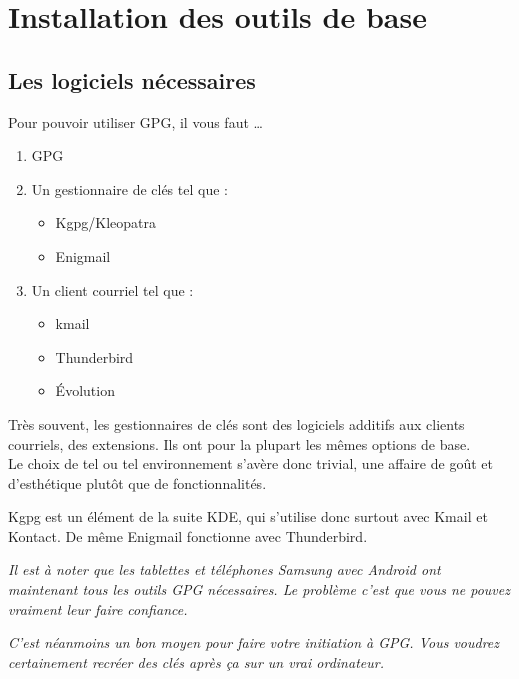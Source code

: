 \chapter{Installation des outils de base}

\section{Les logiciels nécessaires}\label{les-logiciels-nuxe9cessaires}

Pour pouvoir utiliser GPG, il vous faut \ldots{}

\begin{enumerate}
\def\labelenumi{\arabic{enumi}.}
\itemsep1pt\parskip0pt
\item
  GPG
\item
  Un gestionnaire de clés tel que :

  \begin{itemize}
  \itemsep1pt\parskip0pt
  \item
    Kgpg/Kleopatra
  \item
    Enigmail
  \end{itemize}
\item
  Un client courriel tel que :

  \begin{itemize}
  \itemsep1pt\parskip0pt
  \item
    kmail
  \item
    Thunderbird
  \item
    Évolution
  \end{itemize}
\end{enumerate}

Très souvent, les gestionnaires de clés sont des logiciels additifs aux
clients courriels, des extensions. Ils ont pour la plupart les mêmes
options de base.\\Le choix de tel ou tel environnement s'avère donc
trivial, une affaire de goût et d'esthétique plutôt que de
fonctionnalités.

Kgpg est un élément de la suite KDE, qui s'utilise donc surtout avec
Kmail et Kontact. De même Enigmail fonctionne avec Thunderbird.

\emph{Il est à noter que les tablettes et téléphones Samsung avec
Android ont maintenant tous les outils GPG nécessaires. Le problème
c'est que vous ne pouvez vraiment leur faire confiance.}

\emph{C'est néanmoins un bon moyen pour faire votre initiation à GPG.
Vous voudrez certainement recréer des clés après ça sur un vrai
ordinateur.}

